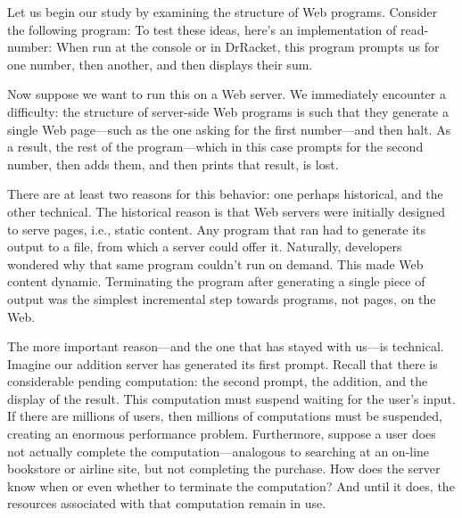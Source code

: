 
Let us begin our study by examining the structure of Web programs. Consider the
following program:
To test these ideas, here’s an implementation of read-number:
When run at the console or in DrRacket, this program prompts us for one number,
then another, and then displays their sum.

Now suppose we want to run this on a Web server. We immediately encounter a
difficulty: the structure of server-side Web programs is such that they generate
a single Web page—such as the one asking for the first number—and then halt. As
a result, the rest of the program—which in this case prompts for the second
number, then adds them, and then prints that result, is lost.


There are at least two reasons for this behavior: one perhaps historical, and
the other technical. The historical reason is that Web servers were initially
designed to serve pages, i.e., static content. Any program that ran had to
generate its output to a file, from which a server could offer it. Naturally,
developers wondered why that same program couldn’t run on demand. This made Web
content dynamic. Terminating the program after generating a single piece of
output was the simplest incremental step towards programs, not pages, on the
Web.

The more important reason—and the one that has stayed with us—is technical.
Imagine our addition server has generated its first prompt. Recall that there is
considerable pending computation: the second prompt, the addition, and the
display of the result. This computation must suspend waiting for the user’s
input. If there are millions of users, then millions of computations must be
suspended, creating an enormous performance problem. Furthermore, suppose a user
does not actually complete the computation—analogous to searching at an on-line
bookstore or airline site, but not completing the purchase. How does the server
know when or even whether to terminate the computation? And until it does, the
resources associated with that computation remain in use.

